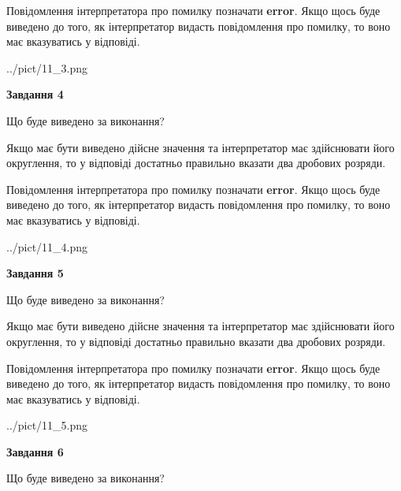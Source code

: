 \documentclass[12pt, ukrainian]{article}
\begin{document}
{\begin {Large}
Повідомлення інтерпретатора про помилку позначати \textbf{error}.
Якщо щось буде виведено до того, як інтерпретатор видасть повідомлення про помилку, 
то воно має вказуватись у відповіді. \par

\begin{center}
	{../pict/11_3.png}
\end{center}
\newpage

{\begin {center}\textbf{Завдання 4}\end {center}}\par
Що буде виведено за виконання? \par

Якщо має бути виведено дійсне значення та інтерпретатор має здійснювати його округлення, 
то у відповіді достатньо правильно вказати два дробових розряди.

Повідомлення інтерпретатора про помилку позначати \textbf{error}.
Якщо щось буде виведено до того, як інтерпретатор видасть повідомлення про помилку, 
то воно має вказуватись у відповіді. \par

\begin{center}
	{../pict/11_4.png}
\end{center}
\newpage

{\begin {center}\textbf{Завдання 5}\end {center}}\par
Що буде виведено за виконання? \par

Якщо має бути виведено дійсне значення та інтерпретатор має здійснювати його округлення, 
то у відповіді достатньо правильно вказати два дробових розряди.

Повідомлення інтерпретатора про помилку позначати \textbf{error}.
Якщо щось буде виведено до того, як інтерпретатор видасть повідомлення про помилку, 
то воно має вказуватись у відповіді. \par

\begin{center}
	{../pict/11_5.png}
\end{center}
\newpage

{\begin {center}\textbf{Завдання 6}\end {center}}\par
Що буде виведено за виконання? \par


\end{Large}}
\end{document}
